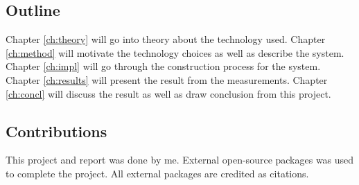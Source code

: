 \subsection{Outline}
\label{ch:intro:outline}
Chapter \ref{ch:theory} will go into theory about the technology used. Chapter \ref{ch:method} will motivate the technology choices as well as describe the system. Chapter \ref{ch:impl} will go through the construction process for the system. Chapter \ref{ch:results} will present the result from the measurements. Chapter \ref{ch:concl} will discuss the result as well as draw conclusion from this project.

\subsection{Contributions}
\label{ch:intro:contributions}
This project and report was done by me. External open-source packages was used to complete the project. All external packages are credited as citations.


